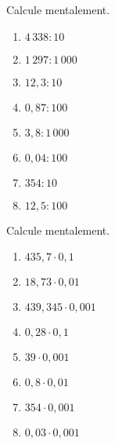 \begin{exercice}
Calcule mentalement.
\begin{enumerate} 
 \item $4\,338 : 10$ \dotfill \hspace*{11em}
 
 \item $1\,297 : 1\,000$ \dotfill \hspace*{11em}
 	
 \item $12,3 : 10$ \dotfill \hspace*{11em}
 
 \item $0,87 : 100$ \dotfill \hspace*{11em}
 	
 \item $3,8 : 1\,000$ \dotfill \hspace*{11em}
 
 \item $0,04 : 100$ \dotfill \hspace*{11em}
 	
 \item $354 : 10$ \dotfill \hspace*{11em}
 
 \item $12,5 : 100$ \dotfill \hspace*{11em}
 
 \end{enumerate}
\end{exercice}


\begin{exercice}
Calcule mentalement.
\begin{enumerate} 
 \item $435,7 \cdot 0,1$ \dotfill \hspace*{11em}
 
 \item $18,73 \cdot 0,01$ \dotfill \hspace*{11em}
 
 \item $439,345 \cdot 0,001$ \dotfill \hspace*{11em}
 
 \item $0,28 \cdot 0,1$ \dotfill \hspace*{11em}
 
 \item $39 \cdot 0,001$ \dotfill \hspace*{11em}
 
 \item $0,8 \cdot 0,01$ \dotfill \hspace*{11em}
 
 \item $354 \cdot 0,001$ \dotfill \hspace*{11em}
 
 \item $0,03 \cdot 0,001$ \dotfill \hspace*{11em}
 
 \end{enumerate}
\end{exercice}

